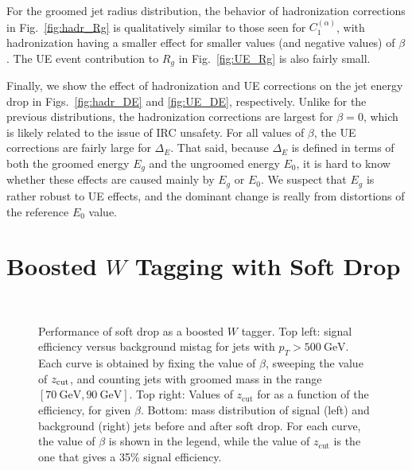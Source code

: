 \documentclass[letterpaper,11pt]{article}
\newcommand{\C}[2]{C^{(#2)}_{#1}}
\newcommand{\zcut}{z_\text{cut}}
\newcommand{\ea}{{\C{1}{\alpha}}}
\DeclareRobustCommand{\Fig}[1]{Fig.~\ref{#1}}
\DeclareRobustCommand{\Figs}[2]{Figs.~\ref{#1} and \ref{#2}}
\begin{document}
For the groomed jet radius distribution, the behavior of hadronization corrections in \Fig{fig:hadr_Rg} is qualitatively similar to those seen for $\ea$, with hadronization having a smaller effect for smaller values (and negative values) of $\beta$.  The UE event contribution to $R_g$ in \Fig{fig:UE_Rg} is also fairly small.

Finally, we show the effect of hadronization and UE corrections on the jet energy drop in \Figs{fig:hadr_DE}{fig:UE_DE}, respectively.  Unlike for the previous distributions, the hadronization corrections are largest for $\beta=0$, which is likely related to the issue of IRC unsafety.  For all values of $\beta$, the UE corrections are fairly large for $\Delta_E$.  That said, because $\Delta_E$ is defined in terms of both the groomed energy $E_g$ and the ungroomed energy $E_0$, it is hard to know whether these effects are caused mainly by $E_g$ or $E_0$.  We suspect that $E_g$ is rather robust to UE effects, and the dominant change is really from distortions of the reference $E_0$ value.


\section{Boosted $W$ Tagging with Soft Drop}
\label{sec:tagging}


\begin{figure}[p]
\begin{center}
$\quad$
~\\
$\quad$
\end{center}
\caption{Performance of soft drop as a boosted $W$ tagger.  Top left:  signal efficiency versus background mistag for jets with $p_T > 500~\text{GeV}$.  Each curve is obtained by fixing the value of $\beta$, sweeping the value of  $z_{\rm cut}$, and counting jets with groomed mass in the range $[70~\text{GeV}, 90~\text{GeV}]$. 
Top right: Values of $\zcut$ for as a function of the efficiency, for given $\beta$.
Bottom: mass distribution of signal (left) and background (right) jets before and after soft drop. 
For each curve, the value of $\beta$ is shown in the legend, while the value of $\zcut$ is the one that gives a 35\% signal efficiency.
}
\label{fig:tagging}
\end{figure}
\end{document}
